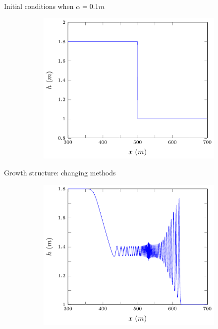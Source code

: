 \documentclass[pdf]{beamer}
\begin{document}
\begin{frame}{Initial conditions when $\alpha = 0.1m$}
	\begin{figure}
		\centering
		\begin{subfigure}{0.75\textwidth}
			\includegraphics[width=\textwidth]{../Pics/init/DBs12/1-figure0.pdf}
		\end{subfigure}%
	\end{figure}
\end{frame}
\begin{frame}{Growth structure: changing methods}
	\begin{figure}
		\begin{subfigure}{0.75\textwidth}
			\includegraphics[width=\textwidth]{../Pics/Models/FD/1-figure0.pdf}
		\end{subfigure}
	\end{figure}
\end{frame}
\end{document}
